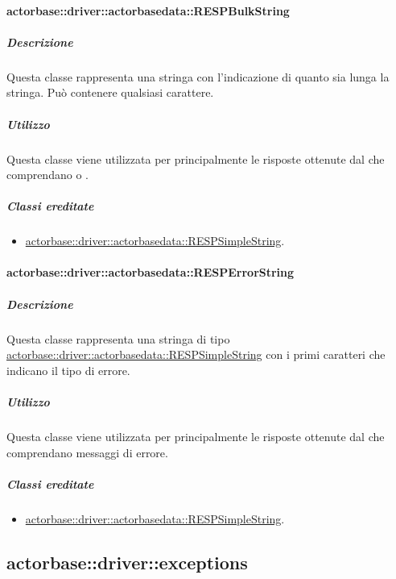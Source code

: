 \documentclass{scalatekids-article}
\begin{document}
\paragraph{actorbase::driver::actorbasedata::RESPBulkString}
\label{sec:actorbase::driver::actorbasedata::RESPBulkString}

\subparagraph{Descrizione}

Questa classe rappresenta una stringa con l'indicazione di quanto sia lunga la
stringa. Può contenere qualsiasi carattere.

\subparagraph{Utilizzo}

Questa classe viene utilizzata per  principalmente le
risposte ottenute dal  che comprendano  o
.

\subparagraph{Classi ereditate}

\begin{itemize}
\item \hyperref[sec:actorbase::driver::actorbasedata::RESPSimpleString]{actorbase::driver::actorbasedata::RESPSimpleString}.
\end{itemize}

\paragraph{actorbase::driver::actorbasedata::RESPErrorString}
\label{sec:actorbase::driver::actorbasedata::RESPErrorString}

\subparagraph{Descrizione}

Questa classe rappresenta una stringa di tipo \hyperref[sec:actorbase::driver::actorbasedata::RESPSimpleString]{actorbase::driver::actorbasedata::RESPSimpleString}
con i primi caratteri che indicano il tipo di errore.

\subparagraph{Utilizzo}

Questa classe viene utilizzata per  principalmente le
risposte ottenute dal  che comprendano messaggi di errore.

\subparagraph{Classi ereditate}

\begin{itemize}
\item \hyperref[sec:actorbase::driver::actorbasedata::RESPSimpleString]{actorbase::driver::actorbasedata::RESPSimpleString}.
\end{itemize}


\subsection{actorbase::driver::exceptions}
\label{sec:actorbase::driver::exceptions}
\end{document}
